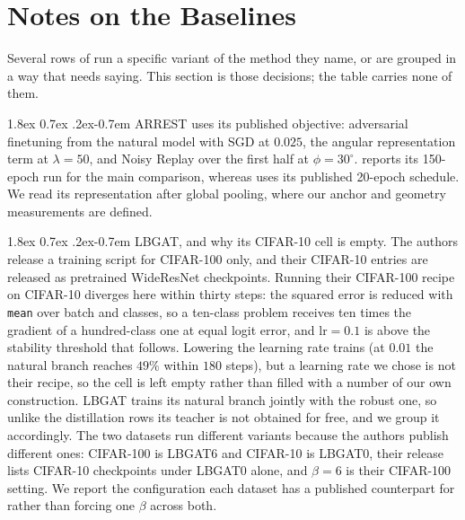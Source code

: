 \documentclass{article} %
\makeatletter
\theoremstyle{plain}
\renewcommand{\paragraph}{\@startsection{paragraph}{4}{\z@}%
  {1.8ex \@plus 0.7ex \@minus .2ex}{-0.7em}%
  {\normalfont\normalsize\bfseries}}
\makeatother
\begin{document}
\section{Notes on the Baselines}
\label{app:baselines}

Several rows of  run a specific variant of the method they name, or are grouped in a
way that needs saying. This section is those decisions; the table carries none of them.

\paragraph{ARREST} uses its published objective: adversarial finetuning from the natural model with
SGD at $0.025$, the angular representation term at $\lambda = 50$, and Noisy Replay over the first
half at $\phi = 30^\circ$.  reports its 150-epoch run for the main comparison, whereas
 uses its published 20-epoch schedule.
We read its representation after global pooling, where our anchor and geometry measurements are
defined.

\paragraph{LBGAT, and why its CIFAR-10 cell is empty.} The authors release a training script for
CIFAR-100 only, and their CIFAR-10 entries are released as pretrained WideResNet checkpoints. Running
their CIFAR-100 recipe on CIFAR-10 diverges here within thirty steps: the squared error is reduced
with \texttt{mean} over batch and classes, so a ten-class problem receives ten times the gradient of
a hundred-class one at equal logit error, and $\mathrm{lr} = 0.1$ is above the stability threshold
that follows. Lowering the learning rate trains (at $0.01$ the natural branch reaches $49\%$ within
$180$ steps), but a learning rate we chose is not their recipe, so the cell is left empty rather than
filled with a number of our own construction. LBGAT trains its natural branch jointly with the robust
one, so unlike the distillation
rows its teacher is not obtained for free, and we group it accordingly. The two datasets run different
variants because the authors publish different ones: CIFAR-100 is LBGAT6 and CIFAR-10 is LBGAT0, their
release lists CIFAR-10 checkpoints under LBGAT0 alone, and $\beta = 6$ is their CIFAR-100 setting. We
report the configuration each dataset has a published counterpart for rather than forcing one $\beta$
across both.
\end{document}
